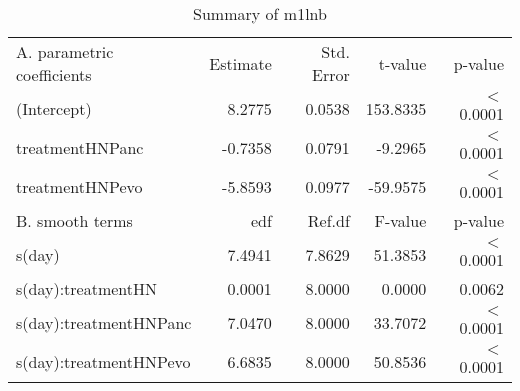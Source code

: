 \begin{table}[ht]
\centering
\begin{tabular}{lrrrr}
   \hline
A. parametric coefficients & Estimate & Std. Error & t-value & p-value \\ 
  (Intercept) & 8.2775 & 0.0538 & 153.8335 & $<$ 0.0001 \\ 
  treatmentHNPanc & -0.7358 & 0.0791 & -9.2965 & $<$ 0.0001 \\ 
  treatmentHNPevo & -5.8593 & 0.0977 & -59.9575 & $<$ 0.0001 \\ 
   \hline
B. smooth terms & edf & Ref.df & F-value & p-value \\ 
  s(day) & 7.4941 & 7.8629 & 51.3853 & $<$ 0.0001 \\ 
  s(day):treatmentHN & 0.0001 & 8.0000 & 0.0000 & 0.0062 \\ 
  s(day):treatmentHNPanc & 7.0470 & 8.0000 & 33.7072 & $<$ 0.0001 \\ 
  s(day):treatmentHNPevo & 6.6835 & 8.0000 & 50.8536 & $<$ 0.0001 \\ 
   \hline
\end{tabular}
\caption{Summary of m1lnb} 
\label{tab.gam}
\end{table}

